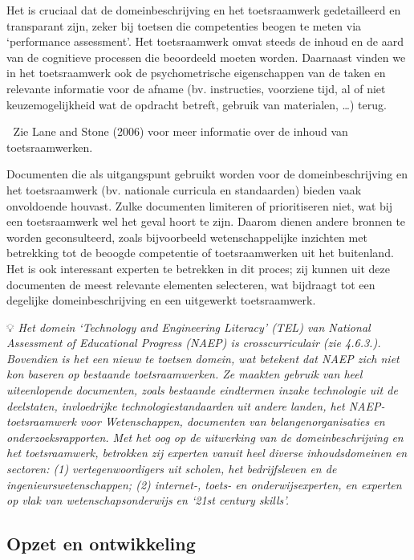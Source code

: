 \documentclass[
  letterpaper,
]{report}
\begin{document}
Het is cruciaal dat de domeinbeschrijving en het toetsraamwerk
gedetailleerd en transparant zijn, zeker bij toetsen die competenties
beogen te meten via `performance assessment'. Het toetsraamwerk omvat
steeds de inhoud en de aard van de cognitieve processen die beoordeeld
moeten worden. Daarnaast vinden we in het toetsraamwerk ook de
psychometrische eigenschappen van de taken en relevante informatie voor
de afname (bv. instructies, voorziene tijd, al of niet keuzemogelijkheid
wat de opdracht betreft, gebruik van materialen, \ldots) terug.

📖 Zie Lane and Stone (2006) voor meer informatie over de inhoud van
toetsraamwerken.

Documenten die als uitgangspunt gebruikt worden voor de
domeinbeschrijving en het toetsraamwerk (bv. nationale curricula en
standaarden) bieden vaak onvoldoende houvast. Zulke documenten limiteren
of prioritiseren niet, wat bij een toetsraamwerk wel het geval hoort te
zijn. Daarom dienen andere bronnen te worden geconsulteerd, zoals
bijvoorbeeld wetenschappelijke inzichten met betrekking tot de beoogde
competentie of toetsraamwerken uit het buitenland. Het is ook
interessant experten te betrekken in dit proces; zij kunnen uit deze
documenten de meest relevante elementen selecteren, wat bijdraagt tot
een degelijke domeinbeschrijving en een uitgewerkt toetsraamwerk.

💡 \emph{Het domein `Technology and Engineering Literacy' (TEL) van
National Assessment of Educational Progress (NAEP) is crosscurriculair
(zie 4.6.3.). Bovendien is het een nieuw te toetsen domein, wat betekent
dat NAEP zich niet kon baseren op bestaande toetsraamwerken. Ze maakten
gebruik van heel uiteenlopende documenten, zoals bestaande eindtermen
inzake technologie uit de deelstaten, invloedrijke
technologiestandaarden uit andere landen, het NAEP-toetsraamwerk voor
Wetenschappen, documenten van belangenorganisaties en
onderzoeksrapporten. Met het oog op de uitwerking van de
domeinbeschrijving en het toetsraamwerk, betrokken zij experten vanuit
heel diverse inhoudsdomeinen en sectoren: (1) vertegenwoordigers uit
scholen, het bedrijfsleven en de ingenieurswetenschappen; (2) internet-,
toets- en onderwijsexperten, en experten op vlak van
wetenschapsonderwijs en `21st century skills'.}

\hypertarget{opzet-en-ontwikkeling}{%
\subsection{Opzet en ontwikkeling}\label{opzet-en-ontwikkeling}}
\end{document}
